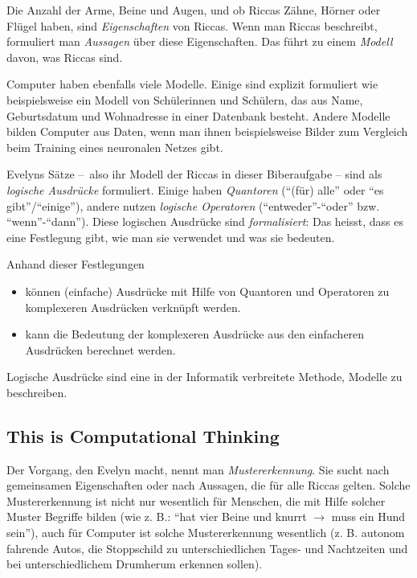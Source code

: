 \documentclass[a4paper,11pt]{report}
\begin{document}
Die Anzahl der Arme, Beine und Augen, und ob Riccas Zähne, Hörner oder Flügel haben, sind \emph{Eigenschaften} von Riccas. Wenn man Riccas beschreibt, formuliert man \emph{Aussagen} über diese Eigenschaften. Das führt zu einem \emph{Modell} davon, was Riccas sind.

Computer haben ebenfalls viele Modelle. Einige sind explizit formuliert wie beispielsweise ein Modell von Schülerinnen und Schülern, das aus Name, Geburtsdatum und Wohnadresse in einer Datenbank besteht. Andere Modelle bilden Computer aus Daten, wenn man ihnen beispielsweise Bilder zum Vergleich beim Training eines neuronalen Netzes gibt.

Evelyns Sätze –~also ihr Modell der Riccas in dieser Biberaufgabe – sind als \emph{logische Ausdrücke} formuliert. Einige haben \emph{Quantoren} (\enquote{(für) alle} oder \enquote{es gibt}/\enquote{einige}), andere nutzen \emph{logische Operatoren} (\enquote{entweder}-\enquote{oder} bzw. \enquote{wenn}-\enquote{dann}). Diese logischen Ausdrücke sind \emph{formalisiert}: Das heisst, dass es eine Festlegung gibt, wie man sie verwendet und was sie bedeuten.

\begin{samepage}
Anhand dieser Festlegungen

\nopagebreak

\begin{itemize}
  \item können (einfache) Ausdrücke mit Hilfe von Quantoren und Operatoren zu komplexeren Ausdrücken verknüpft werden.
  \item kann die Bedeutung der komplexeren Ausdrücke aus den einfacheren Ausdrücken berechnet werden.
\end{itemize}


\end{samepage}

Logische Ausdrücke sind eine in der Informatik verbreitete Methode, Modelle zu beschreiben.


\subsection*{This is Computational Thinking}

Der Vorgang, den Evelyn macht, nennt man \emph{Mustererkennung}. Sie sucht nach gemeinsamen Eigenschaften oder nach Aussagen, die für alle Riccas gelten. Solche Mustererkennung ist nicht nur wesentlich für Menschen, die mit Hilfe solcher Muster Begriffe bilden (wie z. B.: \enquote{hat vier Beine und knurrt \ensuremath{\rightarrow} muss ein Hund sein}), auch für Computer ist solche Mustererkennung wesentlich (z. B. autonom fahrende Autos, die Stoppschild zu unterschiedlichen Tages- und Nachtzeiten und bei unterschiedlichem Drumherum erkennen sollen).
\end{document}
